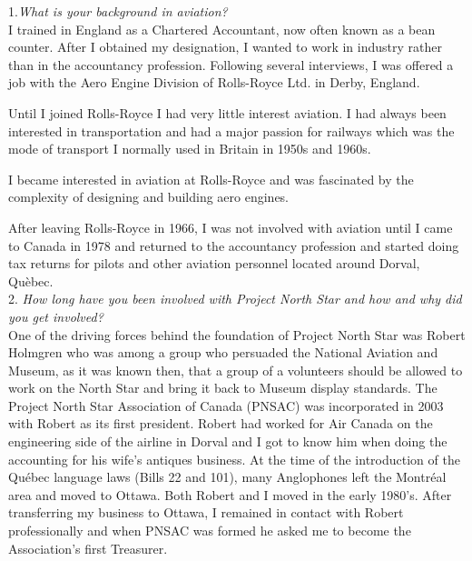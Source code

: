 \begin{multicols}{2}

1.\textit{What is your background in aviation?}\\

I trained in England as a Chartered Accountant, now often known as a bean
counter. After I obtained my designation, I wanted to work in industry rather
than in the accountancy profession. Following several interviews, I was offered
a job with the Aero Engine Division of Rolls-Royce Ltd. in Derby, England.

Until I joined Rolls-Royce I had very little interest aviation. I had always
been interested in transportation and had a major passion for railways which was
the mode of transport I normally used in Britain in 1950s and 1960s.

I became interested in aviation at Rolls-Royce and was fascinated by the
complexity of designing and building aero engines.

After leaving Rolls-Royce in 1966, I was not involved with aviation until I came
to Canada in 1978 and returned to the accountancy profession and started doing
tax returns for pilots and other aviation personnel located around Dorval,
Qu\`{e}bec.\\

2. \textit{How long have you been involved with Project North Star and how and why did you get involved?}\\

One of the driving forces behind the foundation of Project North Star was
Robert Holmgren who was among a group who persuaded the National Aviation and
Museum, as it was known then, that a group of a volunteers should be allowed to
work on the North Star and bring it back to Museum display standards. The
Project North Star Association of Canada (PNSAC) was incorporated in 2003 with
Robert as its first president. Robert had worked for Air Canada on the
engineering side of the airline in Dorval and I got to know him when doing the
accounting for his wife's antiques business. At the time of the introduction of
the Québec language laws (Bills 22 and 101), many Anglophones left the Montr\'{e}al
area and moved to Ottawa. Both Robert and I moved in the early 1980's. After
transferring my business to Ottawa, I remained in contact with Robert
professionally and when PNSAC was formed he asked me to become the Association's
first Treasurer.\\



\end{multicols}

